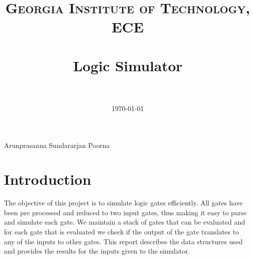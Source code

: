 \documentclass[paper=a4, fontsize=12pt]{scrartcl} %
\title{	
\normalfont \normalsize 
\textsc{Georgia Institute of Technology, ECE} \\ [25pt] %
\horrule{0.5pt} \\[0.4cm] %
\huge Logic Simulator \\ %
\horrule{2pt} \\[0.5cm] %
}
\author{} %
\date{\normalsize\today} %
\numberwithin{equation}{section} %
\numberwithin{figure}{section} %
\numberwithin{table}{section} %
\begin{document}
\maketitle 

\begin{flushright}
Arunprasanna Sundararjan Poorna\newline
\end{flushright}

\newpage
\tableofcontents
\newpage
\vspace{60pt}
\section{Introduction}
The objective of this project is to simulate logic gates efficiently. All gates have been pre processed and reduced to two input gates, thus making it easy to parse and simulate each gate. We maintain a stack of gates that can be evaluated and for each gate that is evaluated we check if the output of the gate translates to any of the inputs to other gates. This report describes the data structures used and provides the results for the inputs given to the simulator. 
\newpage
\end{document}
